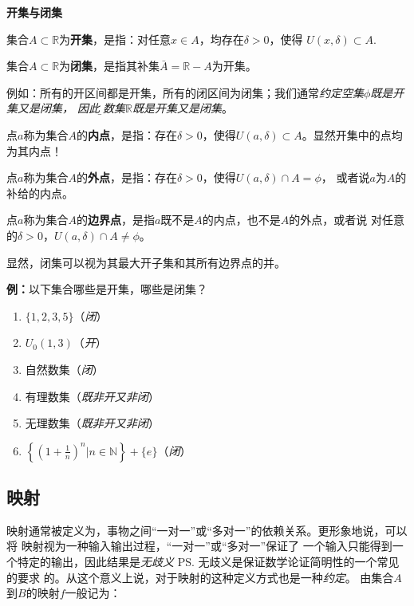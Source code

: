 	\begin{shaded}
	{\bf 开集与闭集}
	
	集合$A\subset\mathbb{R}$为{\bf 开集}，是指：对任意$x\in A$，均存在$\delta>0$，使得
	$U(x,\delta)\subset A.$
	
	集合$A\subset\mathbb{R}$为{\bf 闭集}，是指其补集$\bar{A}=\mathbb{R}-A$为开集。
	
	例如：所有的开区间都是开集，所有的闭区间为闭集；我们通常{\it 约定空集$\phi$既是开集又是闭集，
	因此{\b 实数集$\mathbb{R}$既是开集又是闭集}}。
	
	点$a$称为集合$A$的{\bf 内点}，是指：存在$\delta>0$，使得$U(a,\delta)\subset A$。显然开集中的点均为其内点！
	
	点$a$称为集合$A$的{\bf 外点}，是指：存在$\delta>0$，使得$U(a,\delta)\cap A=\phi$，
	或者说$a$为$A$的补给的内点。
	
	点$a$称为集合$A$的{\bf 边界点}，是指$a$既不是$A$的内点，也不是$A$的外点，或者说
	对任意的$\delta>0$，$U(a,\delta)\cap A\ne\phi$。
	
	显然，闭集可以视为其最大开子集和其所有边界点的并。
	
	{\bf 例：}以下集合哪些是开集，哪些是闭集？
	\begin{enumerate}[(1)]
	  \setlength{\itemindent}{1cm}
	  \item $\{1,2,3,5\}$\quad\quad（{\it 闭}）
	  \item $U_0(1,3)$\quad\quad（{\it 开}）
	  \item 自然数集\quad\quad（{\it 闭}）
	  \item 有理数集\quad\quad（{\it 既非开又非闭}）
	  \item 无理数集\quad\quad（{\it 既非开又非闭}）
	  \item $\left\{\left(1+\frac
	  1n\right)^n|n\in\mathbb{N}\right\}+\{e\}$\quad\quad（{\it 闭}）
	\end{enumerate}
	
	\end{shaded}

\subsection{映射}

映射通常被定义为，事物之间“一对一”或“多对一”的依赖关系。更形象地说，可以将
映射视为一种输入输出过程，“一对一”或“多对一”保证了
一个输入只能得到一个特定的输出，因此结果是{\it 无歧义}
\ps{无歧义是保证数学论证简明性的一个常见的要求}
的。从这个意义上说，对于映射的这种定义方式也是一种{\it 约定}。
由集合$A$到$B$的映射$f$一般记为：

